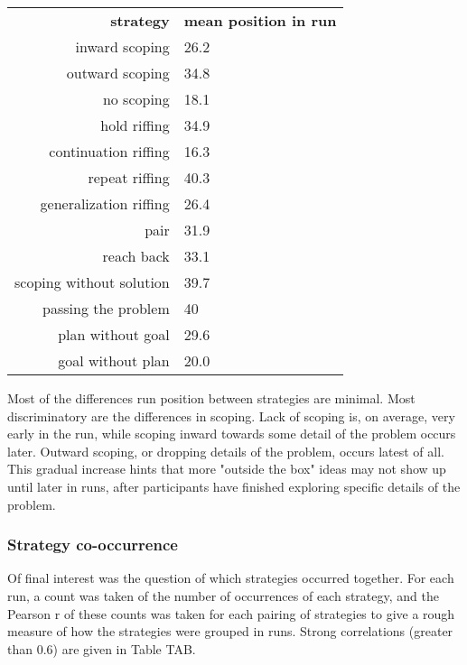 \begin{table}
    \begin{tabular}{r | l}
        \textbf{strategy} & \textbf{mean position in run} \\
        inward scoping & 26.2 \\
        outward scoping & 34.8 \\
        no scoping & 18.1 \\
        \hline \hline
        hold riffing & 34.9 \\
        continuation riffing & 16.3 \\
        repeat riffing & 40.3 \\
        generalization riffing & 26.4 \\
        \hline
        pair & 31.9 \\
        reach back & 33.1 \\
        \hline \hline
        scoping without solution & 39.7 \\
        passing the problem & 40 \\
        plan without goal & 29.6 \\
        goal without plan & 20.0 \\ 
    \end{tabular}
\end{table}

Most of the differences run position between strategies are minimal. Most discriminatory are the differences in scoping. Lack of scoping is, on average, very early in the run, while scoping inward towards some detail of the problem occurs later. Outward scoping, or dropping details of the problem, occurs latest of all. This gradual increase hints that more "outside the box" ideas may not show up until later in runs, after participants have finished exploring specific details of the problem.

\subsubsection{Strategy co-occurrence}

Of final interest was the question of which strategies occurred together. For each run, a count was taken of the number of occurrences of each strategy, and the Pearson r of these counts was taken for each pairing of strategies to give a rough measure of how the strategies were grouped in runs. Strong correlations (greater than 0.6) are given in Table TAB.

